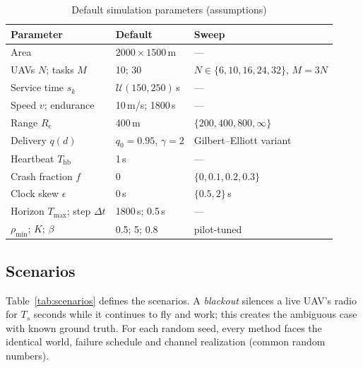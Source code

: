 \documentclass[journal]{IEEEtran}
\newcommand{\Rc}{R_{\mathrm{c}}}
\newcommand{\rhomin}{\rho_{\min}}
\begin{document}
\begin{table}[!t]
\centering
\caption{Default simulation parameters (assumptions)}
\label{tab:params}
\footnotesize
\begin{tabular}{@{}lll@{}}
\toprule
Parameter & Default & Sweep\\
\midrule
Area & $2000\times1500$\,m & ---\\
UAVs $N$; tasks $M$ & 10; 30 & $N\in\{6,10,16,24,32\}$, $M=3N$\\
Service time $s_k$ & $\mathcal{U}(150,250)$\,s & ---\\
Speed $v$; endurance & 10\,m/s; 1800\,s & ---\\
Range $\Rc$ & 400\,m & $\{200,400,800,\infty\}$\\
Delivery $q(d)$ & $q_0=0.95$, $\gamma=2$ & Gilbert--Elliott variant\\
Heartbeat $T_{\mathrm{hb}}$ & 1\,s & ---\\
Crash fraction $f$ & 0 & $\{0,0.1,0.2,0.3\}$\\
Clock skew $\epsilon$ & 0\,s & $\{0.5,2\}$\,s\\
Horizon $T_{\max}$; step $\Delta t$ & 1800\,s; 0.5\,s & ---\\
$\rhomin$; $K$; $\beta$ & 0.5; 5; 0.8 & pilot-tuned\\
\bottomrule
\end{tabular}
\end{table}

\subsection{Scenarios}
Table~\ref{tab:scenarios} defines the scenarios. A \emph{blackout} silences a live UAV's radio for $T_s$ seconds while it continues to fly and work; this creates the ambiguous case with known ground truth. For each random seed, every method faces the identical world, failure schedule and channel realization (common random numbers).
\end{document}
